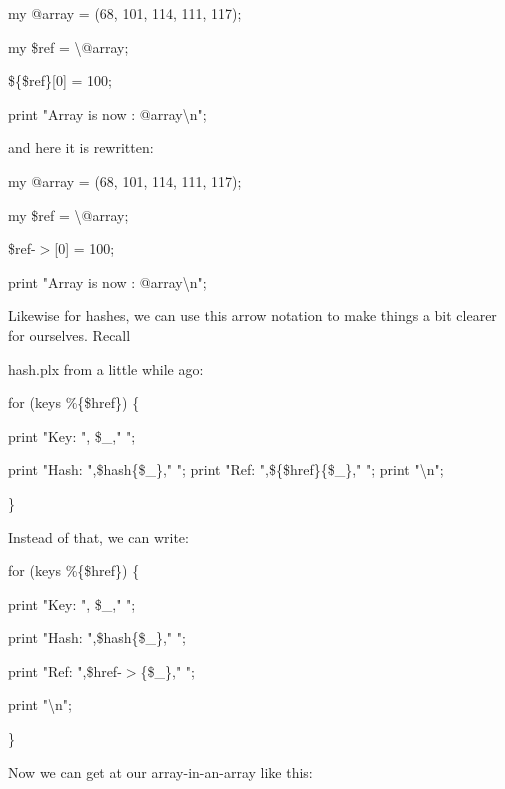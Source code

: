 \documentclass[a4paper,11pt]{book}
\begin{document}
\noindent 

\noindent 

\noindent my @array = (68, 101, 114, 111, 117);

\noindent my \$ref = \textbackslash @array;

\noindent \$\{\$ref\}[0] = 100;

\noindent print "Array is now : @array\textbackslash n";

\noindent 

\noindent and here it is rewritten:

\noindent 

\noindent 

\noindent my @array = (68, 101, 114, 111, 117);

\noindent my \$ref = \textbackslash @array;

\noindent \$ref-$>$[0] = 100;

\noindent print "Array is now : @array\textbackslash n";

\noindent 

\noindent Likewise for hashes, we can use this arrow notation to make things a bit clearer for ourselves. Recall

\noindent hash.plx from a little while ago:

\noindent 

\noindent 

\noindent for (keys \%\{\$href\}) \{

\noindent print "Key: ", \$\_," ";

\noindent print "Hash: ",\$hash\{\$\_\}," "; print "Ref: ",\$\{\$href\}\{\$\_\}," "; print "\textbackslash n";

\noindent \}

\noindent 

\noindent Instead of that, we can write:

\noindent 

\noindent 

\noindent for (keys \%\{\$href\}) \{

\noindent print "Key: ", \$\_," ";

\noindent print "Hash: ",\$hash\{\$\_\}," ";

\noindent print "Ref: ",\$href-$>$\{\$\_\}," ";

\noindent print "\textbackslash n";

\noindent \}

\noindent 

\noindent Now we can get at our array-in-an-array like this:
\end{document}
